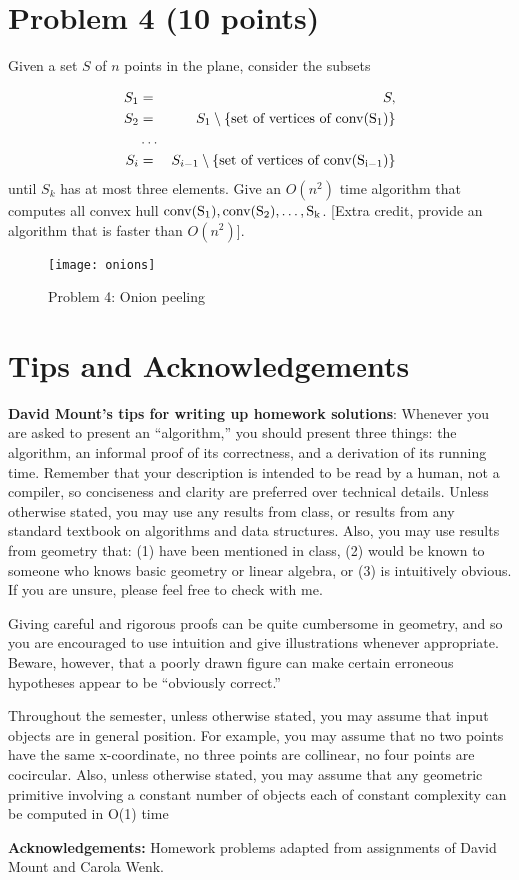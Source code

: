 \documentclass[11pt]{article}
\newcommand{\conv}[1]{\rm{conv}(#1)}
\begin{document}
\section*{Problem 4 (10 points)}

Given a set $S$ of $n$ points in the plane, consider the subsets

\begin{eqnarray*}
	S_1 &=& S, \\
	S_2 &=& S_1 \setminus \{ \text{set of vertices of } \conv{S_1} \} \\
		&\ldots& \\
	S_i &=& S_{i-1} \setminus \{ \text{set of vertices of } \conv{S_{i-1}} \}
\end{eqnarray*}
%
until $S_k$ has at most three elements.  Give an $O(n^2)$ time algorithm that
computes all convex hull $\conv{S_1}, \conv{S_2}, \ldots, S_k$.  [Extra credit,
provide an algorithm that is faster than $O(n^2)$].

\begin{figure}[h]
    \centering
    \texttt{[image: onions]}
    \caption{Problem 4: Onion peeling}
\end{figure}

\section*{Tips and Acknowledgements}

{\bf David Mount's tips for writing up homework solutions}: Whenever you are
asked to present an ``algorithm,'' you should present three things: the
algorithm, an informal proof of its correctness, and a derivation of its
running time.  Remember that your description is intended to be read by a
human, not a compiler, so conciseness and clarity are preferred over technical
details.  Unless otherwise stated, you may use any results from class, or
results from any standard textbook on algorithms and data structures. Also, you
may use results from geometry that: (1) have been mentioned in class, (2) would
be known to someone who knows basic geometry or linear algebra, or (3) is
intuitively obvious. If you are unsure, please feel free to check with me.

Giving careful and rigorous proofs can be quite cumbersome in geometry, and so
you are encouraged to use intuition and give illustrations whenever appropriate.
Beware, however, that a poorly drawn figure can make certain erroneous
hypotheses appear to be ``obviously correct.''

Throughout the semester, unless otherwise stated, you may assume that input
objects are in general position. For example, you may assume that no two points
have the same x-coordinate, no three points are collinear, no four points are
cocircular. Also, unless otherwise stated, you may assume that any geometric
primitive involving a constant number of objects each of constant complexity can
be computed in O(1) time

{\bf Acknowledgements:} Homework problems adapted from assignments of David
Mount and Carola Wenk.
\end{document}
